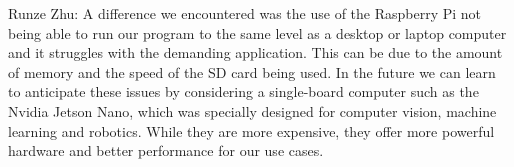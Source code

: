 \documentclass[12pt, titlepage]{article}
\begin{document}
\begin{enumerate}
  Runze Zhu: A difference we encountered was the use of the Raspberry Pi not being able to run our program to the same level as a desktop or laptop computer and it struggles with the demanding application. This can be due to the amount of memory and the speed of the SD card being used. In the future we can learn to anticipate these issues by considering a single-board computer such as the Nvidia Jetson Nano, which was specially designed for computer vision, machine learning and robotics. While they are more expensive, they offer more powerful hardware and better performance for our use cases.

\end{enumerate}
\end{document}
